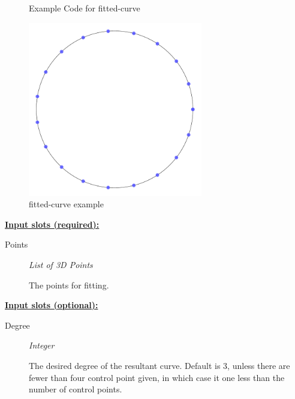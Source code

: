 \documentclass [11pt]{book}
\begin{document}
\begin{itemize}
\begin{figure}
\caption{Example Code for fitted-curve}

\label{fig:example-code-fitted-curve}

\end{figure}

\begin{figure}
\begin{center}
\includegraphics[width=3in,height=3in]{../images/example-fitted-curve.pdf}
\end{center}

\caption{fitted-curve example}

\label{fig:fitted-curve}

\end{figure}





\textbf{
\underline{Input slots (required):}}

\begin{description}

\item [Points]
\emph{List of 3D Points}

 The points for fitting.




\end{description}






\textbf{
\underline{Input slots (optional):}}

\begin{description}

\item [Degree]
\emph{Integer}

 The desired degree of the resultant curve. Default is 3, unless there are fewer than four control point given,
in which case it one less than the number of control points.





\end{description}
\end{itemize}
\end{document}
